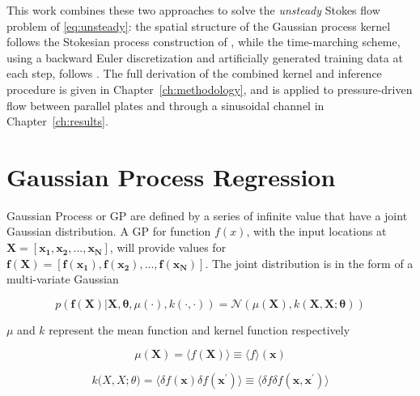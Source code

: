 \documentclass[11pt, a4paper]{report}
\begin{document}
This work combines these two approaches to solve the \emph{unsteady} Stokes flow
problem of \eqref{eq:unsteady}: the spatial structure of the Gaussian process kernel
follows the Stokesian process construction of \textcite{Molina2023}, while the
time-marching scheme, using a backward Euler discretization and artificially
generated training data at each step, follows \textcite{Raissi2018}. The full
derivation of the combined kernel and inference procedure is given in
Chapter~\ref{ch:methodology}, and is applied to pressure-driven flow between parallel
plates and through a sinusoidal channel in Chapter~\ref{ch:results}.

\pagebreak

\section{Gaussian Process Regression}

Gaussian Process or GP are defined by a series of infinite value that have a 
joint Gaussian distribution.
A GP for function \(f(x)\), with the input locations at \(\boldsymbol{X} =[\boldsymbol{x_1},\boldsymbol{x_2},...,\boldsymbol{x_N}] \), will provide values for
\(\boldsymbol{f(X)}=[\boldsymbol{f(x_1)},\boldsymbol{f(x_2)},...,\boldsymbol{f(x_N)}]\). The joint distribution is in the form of a multi-variate Gaussian

\vspace{0.5cm}

\begin{equation}
    p(\boldsymbol{f(X)} | \boldsymbol{X},\boldsymbol{\theta},\mu(\cdot),k(\cdot,\cdot)) = 
    \mathcal{N}\left(
        \mu(\boldsymbol{X}),k\boldsymbol{(X,X;\theta)}
    \right)
\end{equation}

\vspace{0.5cm}

\noindent \(\mu\) and \(k\) represent the mean function and kernel function respectively

\vspace{0.5cm}

\begin{equation}
    \mu(\boldsymbol{X})=\langle f(\boldsymbol{X}) \rangle \equiv \langle f \rangle (\boldsymbol{x})
\end{equation}

\vspace{0.5cm}

\begin{equation}
    k\boldsymbol(X,X;\theta)=\langle \delta f(\boldsymbol{x}) \delta f(\boldsymbol{x^{'}}) \rangle \equiv \langle \delta f\delta f (\boldsymbol{x},\boldsymbol{x^{'}}) \rangle
\end{equation}
\end{document}
